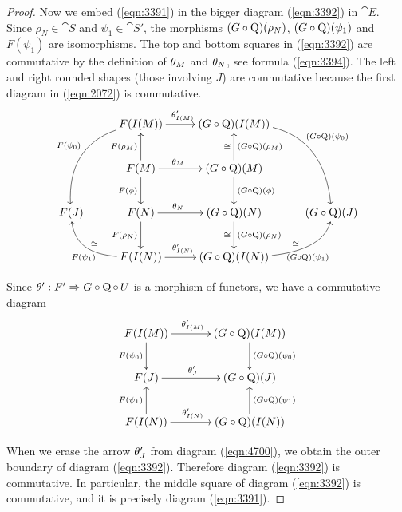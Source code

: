 \begin{proof}
Now we embed (\ref{eqn:3391}) in the bigger diagram (\ref{eqn:3392})
in $\cat{E}$. 
Since $\rho_N \in \cat{S}$ and $\psi_1 \in \cat{S}'$, 
the morphisms $(G \circ \operatorname{Q})(\rho_N)$, $(G \circ \mathrm{Q})(\psi_1)$ and 
$F(\psi_1)$ are isomorphisms. The top and bottom squares in (\ref{eqn:3392}) 
are commutative by the definition of $\theta_M$ and $\theta_N$, see formula 
(\ref{eqn:3394}). The left and right rounded shapes (those involving $J$) are 
commutative because the first diagram in (\ref{eqn:2072}) is commutative. 
\begin{equation} \label{eqn:3392}
\UseTips  \xymatrix @C=6ex @R=5.5ex {
&
F(I(M))
\ar[r]^(0.45){\th'_{I(M)}}
\ar @/_2.5em/ [ddl]_{F(\psi_0)}
&
(G \circ \opn{Q})(I(M))
\ar @/^3em/ [ddr]^{(G \circ \mrm{Q})(\psi_0)}
\\
&
F(M)
\ar[u]^{F(\rho_M)}
\ar[r]^(0.4){\th_M}
\ar[d]_{F(\phi)}
&
(G \circ \opn{Q})(M)
\ar[u]_{(G \circ \opn{Q})(\rho_M)}^{\cong}
\ar[d]^{(G \circ \opn{Q})(\phi)}
\\
F(J)
&
F(N)
\ar[r]^(0.4){\th_N}
\ar[d]_{F(\rho_N)}
&
(G \circ \opn{Q})(N)
\ar[d]^{(G \circ \opn{Q})(\rho_N)}_{\cong}
&
(G \circ \opn{Q})(J)
\\
&
F(I(N))
\ar@(l,d)[ul]^{F(\psi_1)}_{\cong}
\ar[r]^(0.45){\th'_{I(N)}}
&
(G \circ \opn{Q})(I(N))
\ar@(r,d)[ur]_{\ (G \circ \mrm{Q})(\psi_1)}^{\cong}
}
\end{equation}

\medskip 
Since $\theta' : F' \Rightarrow G \circ \operatorname{Q} \circ \, U$ is a morphism of functors, 
we have a commutative diagram 
\begin{equation} \label{eqn:4700}
\UseTips  \xymatrix @C=8ex @R=5.5ex {
F(I(M))
\ar[r]^(0.45){\th'_{I(M)}}
\ar[d]_{F(\psi_0)}
&
(G \circ \opn{Q})(I(M))
\ar[d]^{(G \circ \opn{Q})(\psi_0)}
\\
F(J)
\ar[r]^(0.45){\th'_{J}}
&
(G \circ \opn{Q})(J)
\\
F(I(N))
\ar[u]^{F(\psi_1)}
\ar[r]^(0.45){\th'_{I(N)}}
&
(G \circ \opn{Q})(I(N))
\ar[u]_{(G \circ \opn{Q})(\psi_1)}
}
\end{equation}

\medskip \noindent
When we erase the arrow $\theta'_{J}$ from diagram (\ref{eqn:4700}), we obtain the 
outer boundary of diagram (\ref{eqn:3392}). Therefore diagram 
(\ref{eqn:3392}) is commutative. In particular, the middle square of diagram 
(\ref{eqn:3392}) is commutative, and it is precisely diagram (\ref{eqn:3391}).
\end{proof}

